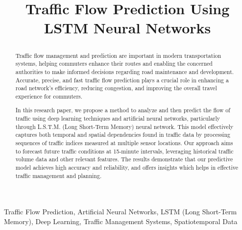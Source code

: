 \documentclass[conference]{IEEEtran}
\begin{document}
\title{Traffic Flow Prediction Using LSTM Neural Networks\\
{\footnotesize \textsuperscript{}}

}

\author{
\and
{}

}

\maketitle

\begin{abstract}
Traffic flow management and prediction are important in modern transportation systems, helping commuters enhance their routes and enabling the concerned authorities to make informed decisions regarding road maintenance and development. Accurate, precise, and fast traffic flow prediction plays a crucial role in enhancing a road network's efficiency, reducing congestion, and improving the overall travel experience for commuters. 

In this research paper, we propose a method to analyze and then predict the flow of traffic using deep learning techniques and artificial neural networks, particularly through L.S.T.M. (Long Short-Term Memory) neural network. This model effectively captures both temporal and spatial dependencies found in traffic data by processing sequences of traffic indices measured at multiple sensor locations. Our approach aims to forecast future traffic conditions at 15-minute intervals, leveraging historical traffic volume data and other relevant features. The results demonstrate that our predictive model achieves high accuracy and reliability, and offers insights which helps in effective traffic management and planning.

\end{abstract}

\begin{IEEEkeywords}
Traffic Flow Prediction, Artificial Neural Networks, LSTM (Long Short-Term Memory), Deep Learning, Traffic Management Systems, Spatiotemporal Data
\end{IEEEkeywords}
\end{document}
